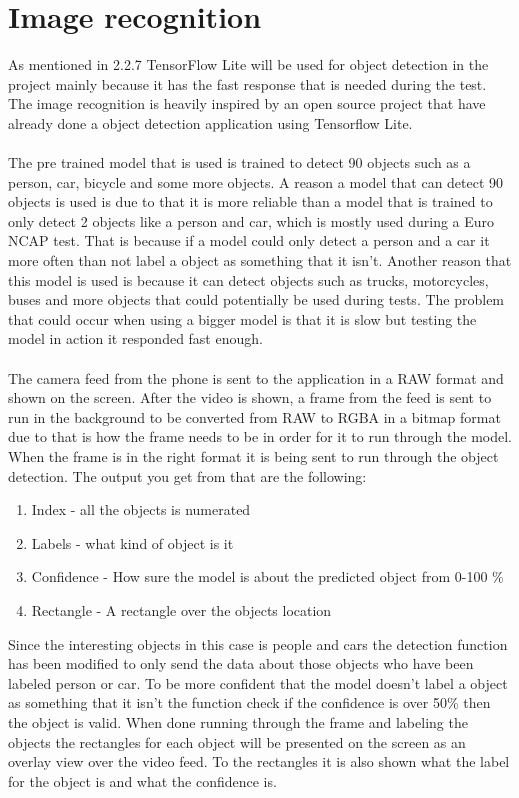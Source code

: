 \section{Image recognition} \label{sec:image_rec}
As mentioned in 2.2.7 TensorFlow Lite will be used for object detection in the project mainly because it has the fast response that is needed during the test. The image recognition is heavily inspired by an open source project  that have already done a object detection application using Tensorflow Lite. 
\\ \\
The pre trained model that is used is trained to detect 90 objects such as a person, car, bicycle and some more objects. A reason a model that can detect 90 objects is used is due to that it is more reliable than a model that is trained to only detect 2 objects like a person and car, which is mostly used during a Euro NCAP test. That is because if a model could only detect a person and a car it more often than not label a object as something that it isn't. Another reason that this model is used is because it can detect objects such as trucks, motorcycles, buses and more objects that could potentially be used during tests. The problem that could occur when using a bigger model is that it is slow but testing the model in action it responded fast enough. 
\\ \\
The camera feed from the phone is sent to the application in a RAW format and shown on the screen. After the video is shown, a frame from the feed is sent to run in the background to be converted from RAW to RGBA in a bitmap format due to that is how the frame needs to be in order for it to run through the model. When the frame is in the right format it is being sent to run through the object detection. The output you get from that are the following:
\begin{enumerate}
    \item Index - all the objects is numerated
    \item Labels - what kind of object is it
    \item Confidence - How sure the model is about the predicted object from 0-100 \%
    \item Rectangle - A rectangle over the objects location
\end{enumerate}
Since the interesting objects in this case is people and cars the detection function has been modified to only send the data about those objects who have been labeled person or car. To be more confident that the model doesn't label a object as something that it isn't the function check if the confidence is over 50\% then the object is valid. When done running through the frame and labeling the objects the rectangles for each object will be presented on the screen as an overlay view over the video feed. To the rectangles it is also shown what the label for the object is and what the confidence is.

